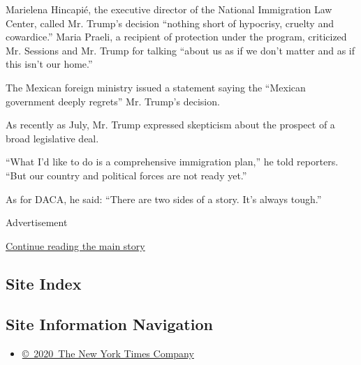 Marielena Hincapié, the executive director of the National Immigration
Law Center, called Mr. Trump's decision ``nothing short of hypocrisy,
cruelty and cowardice.'' Maria Praeli, a recipient of protection under
the program, criticized Mr. Sessions and Mr. Trump for talking ``about
us as if we don't matter and as if this isn't our home.''

The Mexican foreign ministry issued a statement saying the ``Mexican
government deeply regrets'' Mr. Trump's decision.

As recently as July, Mr. Trump expressed skepticism about the prospect
of a broad legislative deal.

``What I'd like to do is a comprehensive immigration plan,'' he told
reporters. ``But our country and political forces are not ready yet.''

As for DACA, he said: ``There are two sides of a story. It's always
tough.''

Advertisement

\protect\hyperlink{after-bottom}{Continue reading the main story}

\hypertarget{site-index}{%
\subsection{Site Index}\label{site-index}}

\hypertarget{site-information-navigation}{%
\subsection{Site Information
Navigation}\label{site-information-navigation}}

\begin{itemize}
\tightlist
\item
  \href{https://help.nytimes3xbfgragh.onion/hc/en-us/articles/115014792127-Copyright-notice}{©~2020~The
  New York Times Company}
\end{itemize}

